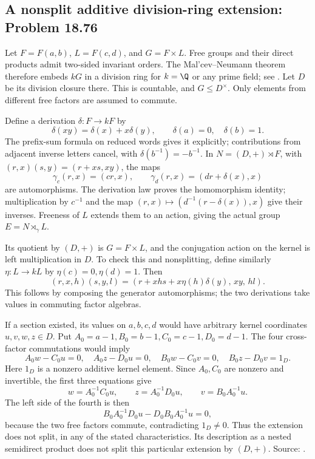 \subsection{A nonsplit additive division-ring extension: Problem 18.76}
\label{cand:18.76}

Let \(F=F(a,b)\), \(L=F(c,d)\), and \(G=F\times L\).
Free groups and their direct products admit two-sided
invariant orders. The Mal'cev--Neumann theorem therefore
embeds \(kG\) in a division ring for \(k=\Q\) or any
prime field; see \cite{sakarovitch,bergman}.
Let \(D\) be its division closure there. This is countable,
and \(G\leq D^\times\). Only elements from different
free factors are assumed to commute.

Define a derivation \(\delta:F\to kF\) by
\[
 \delta(xy)=\delta(x)+x\delta(y),\qquad
 \delta(a)=0,\quad\delta(b)=1.
\]
The prefix-sum formula on reduced words gives it
explicitly; contributions from adjacent inverse letters
cancel, with \(\delta(b^{-1})=-b^{-1}\).
In \(N=(D,+)\rtimes F\), with
\((r,x)(s,y)=(r+xs,xy)\), the maps
\[
 \gamma_c(r,x)=(cr,x),\qquad
 \gamma_d(r,x)=(dr+\delta(x),x)
\]
are automorphisms. The derivation law proves the
homomorphism identity; multiplication by \(c^{-1}\) and
the map \((r,x)\mapsto(d^{-1}(r-\delta(x)),x)\) give
their inverses. Freeness of \(L\) extends them to an
action, giving the actual group \(E=N\rtimes_\gamma L\).

Its quotient by \((D,+)\) is \(G=F\times L\), and the
conjugation action on the kernel is left multiplication
in \(D\). To check this and nonsplitting, define similarly
\(\eta:L\to kL\) by \(\eta(c)=0,\eta(d)=1\). Then
\[
 (r,x,h)(s,y,l)
   =(r+xhs+x\eta(h)\delta(y),\,xy,\,hl).
\]
This follows by composing the generator automorphisms;
the two derivations take values in commuting factor
algebras.

If a section existed, its values on \(a,b,c,d\) would
have arbitrary kernel coordinates \(u,v,w,z\in D\).
Put \(A_0=a-1,B_0=b-1,C_0=c-1,D_0=d-1\).
The four cross-factor commutations would imply
\[
 A_0w-C_0u=0,\quad A_0z-D_0u=0,\quad
 B_0w-C_0v=0,\quad B_0z-D_0v=1_D.
\]
Here \(1_D\) is a nonzero additive kernel element.
Since \(A_0,C_0\) are nonzero and invertible,
the first three equations give
\[
 w=A_0^{-1}C_0u,\qquad
 z=A_0^{-1}D_0u,\qquad
 v=B_0A_0^{-1}u.
\]
The left side of the fourth is then
\[
 B_0A_0^{-1}D_0u-D_0B_0A_0^{-1}u=0,
\]
because the two free factors commute, contradicting
\(1_D\ne0\). Thus the extension does not split, in any
of the stated characteristics. Its description as a
nested semidirect product does not split this particular
extension by \((D,+)\). Source:
.

